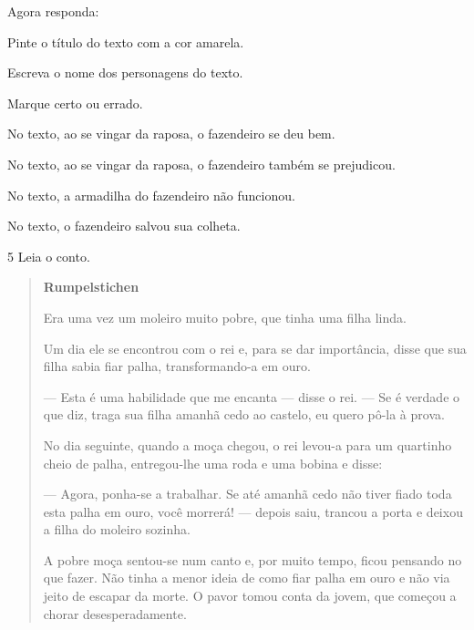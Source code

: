Agora responda:

\begin{escolha}
\item Pinte o título do texto com a cor amarela.

\item Escreva o nome dos personagens do texto.


\item Marque certo ou errado.

\begin{boxlist}
\boxitem[] No texto, ao se vingar da raposa, o fazendeiro se deu bem.

\boxitem[] No texto, ao se vingar da raposa, o fazendeiro também se prejudicou.

\boxitem[] No texto, a armadilha do fazendeiro não funcionou.

\boxitem[] No texto, o fazendeiro salvou sua colheta.
\end{boxlist}
\end{escolha}

\num{5} Leia o conto.


\begin{quote}
\textbf{Rumpelstichen}

Era uma vez um moleiro muito pobre, que tinha uma filha linda.

Um dia ele se encontrou com o rei e, para se dar importância,
disse que sua filha sabia fiar palha, transformando-a em ouro.

--- Esta é uma habilidade que me encanta --- disse o
rei. --- Se é verdade o que diz, traga sua filha amanhã cedo ao
castelo, eu quero pô-la à prova.

No dia seguinte, quando a moça chegou, o rei levou-a
para um quartinho cheio de palha, entregou-lhe uma roda e uma
bobina e disse:

--- Agora, ponha-se a trabalhar. Se até amanhã cedo
não tiver fiado toda esta palha em ouro, você morrerá! ---
depois saiu, trancou a porta e deixou a filha do moleiro
sozinha.

A pobre moça sentou-se num canto e, por muito tempo,
ficou pensando no que fazer. Não tinha a menor ideia de como
fiar palha em ouro e não via jeito de escapar da morte. O
pavor tomou conta da jovem, que começou a chorar
desesperadamente.
\end{quote}

